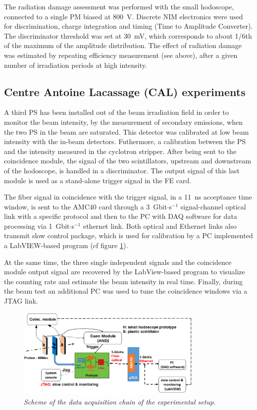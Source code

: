 \documentclass[a4paper,11pt]{article}
\begin{document}
The radiation damage assessment was performed with the small hodoscope, connected to a single PM biased at 800~V. Discrete NIM electronics were used for discrimination, charge integration and timing (Time to Amplitude Converter). The discriminator threshold was set at 30~mV, which corresponds to about 1/6th of the maximum of the amplitude distribution. The effect of radiation damage was estimated by repeating efficiency measurement (see above), after a given number of irradiation periods at high intensity.

\subsection{Centre Antoine Lacassage (CAL) experiments}
\label{In-beam_tests}

A third PS has been installed out of the beam irradiation field in order to monitor the beam intensity, by the measurement of secondary emissions, when the two PS in the beam are saturated. This detector was calibrated at low beam intensity with the in-beam detectors. Futhermore, a calibration between the PS and the intensity measured in the cyclotron stripper. After being sent to the coincidence module, the signal of the two scintillators, upstream and downstream of the hodoscope, is handled in a discriminator. The output signal of this last module is used as a stand-alone trigger signal in the FE card. 

The fiber signal in coincidence with the trigger signal, in a 11~ns acceptance time window, is sent to the AMC40 card through a 3~Gbit$\cdot$s$^{-1}$ signal-channel optical link with a specific protocol and then to the PC with DAQ software for data processing via 1~Gbit$\cdot$s$^{-1}$ ethernet link. Both optical and Ethernet links also transmit slow control package, which is used for calibration by a PC implemented a LabVIEW-based program (cf figure \ref{fig:Scheme_Setup_hodo}). 

At the same time, the three single independent signals and the coincidence module output signal are recovered by the LabView-based program to visualize the counting rate and estimate the beam intensity in real time.
Finally, during the beam test an additional PC was used to tune the coincidence windows via a JTAG link.

\begin{figure}[htb]
\centering
\includegraphics[width=0.8\textwidth]{figures/Scheme_Setup_Nice_08_2019.pdf}
\caption{\small{\textit{Scheme of the data acquisition chain of the experimental setup.}}}
\label{fig:Scheme_Setup_hodo}
\end{figure}
\end{document}
